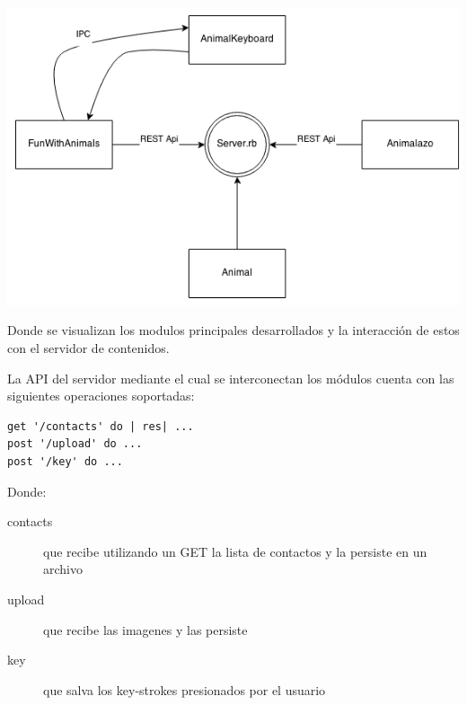 \begin{minipage}{1.0\textwidth}
    \centering
    \includegraphics[width=.7\linewidth]{arquitectura}
\end{minipage}%



Donde se visualizan los modulos principales desarrollados y la interacci\'on de estos con el servidor de contenidos.

La API del servidor mediante el cual se interconectan los m\'odulos cuenta con las siguientes operaciones soportadas:


\begin{lstlisting}
get '/contacts' do | res| ...
post '/upload' do ...
post '/key' do ...

\end{lstlisting}

Donde:

\begin{description}
    \item[contacts] que recibe utilizando un GET la lista de contactos y la persiste en un archivo
    \item[upload] que recibe las imagenes y las persiste
    \item [key] que salva los key-strokes presionados por el usuario
\end{description}

